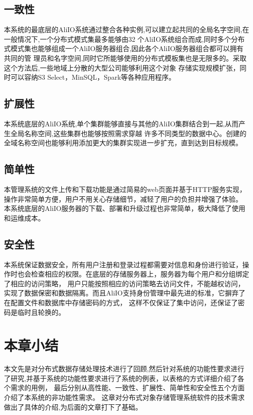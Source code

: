 \subsection{一致性}
本系统的最底层的AliIO系统通过整合各种实例,可以建立起共同的全局名字空间,在一般情况下,一个分布式模式集最多能够由32
个AliIO系统组合而成,同时多个分布式模式集也能够组成一个AliIO服务器组合,因此各个AliIO服务器组合都可以拥有共同的管
理员和名字空间,同时它所能够使用的分布式模板集也是无限多的。采取这个方法后,一些地域上分散的大型公司能够利用这个对象
存储实现规模扩张，同时可以容纳S3 Select，MinSQL，Spark等各种应用程序。


\subsection{扩展性}
本系统底层的AliIO系统,单个集群能够直接与其他的AliIO集群结合到一起,从而产生全局名称空间,这些集群也能够按照需求穿越
许多不同类型的数据中心。创建的全域名称空间也能够利用添加更大的集群实现进一步扩充，直到达到目标规模。


\subsection{简单性}

本管理系统的文件上传和下载功能是通过简易的web页面并基于HTTP服务实现，操作非常简单方便，用户不用关心存储细节，减轻了用户的负担并增强了体验。
本系统底层的AliIO服务器的下载、部署和升级过程也非常简单，极大降低了使用和运维成本。


\subsection{安全性}

本系统保证数据安全，所有用户注册和登录过程都需要对信息和身份进行验证，操作时也会检查相应的权限。在底层的存储服务器上，服务器为每个用户和分组绑定了相应的访问策略，
用户只能按照相应的访问策略去访问文件，不能越权访问，实现了数据保密和数据隔离。而且AliIO支持身份管理中最先进的标准，它摒弃了在配置文件和数据库中存储密码的方式，
这样不仅保证了集中访问，还保证了密码是临时且轮换的。

\section{本章小结}

本文先是对分布式数据存储处理技术进行了回顾,然后针对系统的功能性要求进行了研究,并基于系统的功能性要求进行了系统的例表，以表格的方式详细介绍了各个需求的用例，
最后分别从高性能、一致性、扩展性、简单性和安全性五个方面介绍了本系统的非功能性需求。
这章对分布式对象存储管理系统软件的技术需求做出了具体的介绍,为后面的文章打下了基础。